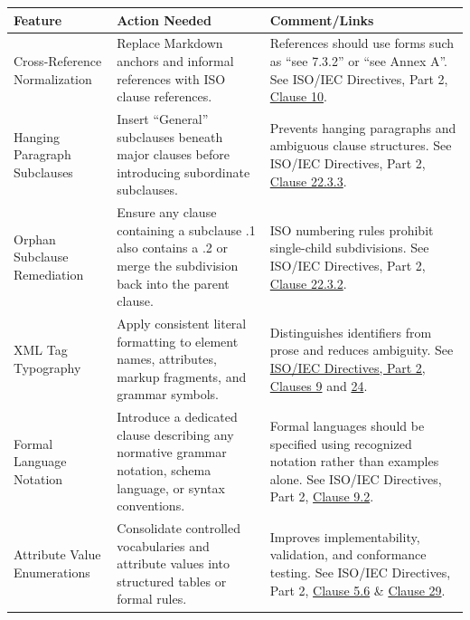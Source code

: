\documentclass[11pt,a4paper]{article}
\begin{document}
\begin{table}[h]
\begin{tabular}{|l|l|l|}
\hline
\textbf{Feature} & \textbf{Action Needed} & \textbf{Comment/Links} \\ \hline
Cross-Reference Normalization & Replace Markdown anchors and informal references with ISO clause references. & References should use forms such as “see 7.3.2” or “see Annex A”. See ISO/IEC Directives, Part 2, \href{https://www.iso.org/sites/directives/current/part2/index.xhtml\#\_idTextAnchor005}{Clause 10}. \\ \hline
Hanging Paragraph Subclauses & Insert “General” subclauses beneath major clauses before introducing subordinate subclauses. & Prevents hanging paragraphs and ambiguous clause structures. See ISO/IEC Directives, Part 2, \href{https://www.iso.org/sites/directives/current/part2/index.xhtml\#\_idTextAnchor005}{Clause 22.3.3}. \\ \hline
Orphan Subclause Remediation & Ensure any clause containing a subclause .1 also contains a .2 or merge the subdivision back into the parent clause. & ISO numbering rules prohibit single-child subdivisions. See ISO/IEC Directives, Part 2, \href{https://www.iso.org/sites/directives/current/part2/index.xhtml\#\_idTextAnchor005}{Clause 22.3.2}. \\ \hline
XML Tag Typography & Apply consistent literal formatting to element names, attributes, markup fragments, and grammar symbols. & Distinguishes identifiers from prose and reduces ambiguity. See \href{https://www.iso.org/sites/directives/current/part2/index.xhtml\#\_idTextAnchor005}{ISO/IEC Directives, Part 2, Clauses 9} and \href{https://www.iso.org/sites/directives/current/part2/index.xhtml\#\_idTextAnchor005}{24}. \\ \hline
Formal Language Notation & Introduce a dedicated clause describing any normative grammar notation, schema language, or syntax conventions. & Formal languages should be specified using recognized notation rather than examples alone. See ISO/IEC Directives, Part 2, \href{https://www.iso.org/sites/directives/current/part2/index.xhtml\#\_idTextAnchor005}{Clause 9.2}. \\ \hline
Attribute Value Enumerations & Consolidate controlled vocabularies and attribute values into structured tables or formal rules. & Improves implementability, validation, and conformance testing. See ISO/IEC Directives, Part 2, \href{https://www.iso.org/sites/directives/current/part2/index.xhtml\#\_idTextAnchor005}{Clause 5.6} \& \href{https://www.iso.org/sites/directives/current/part2/index.xhtml\#\_idTextAnchor005}{Clause 29}. \\ \hline

\end{tabular}
\end{table}
\end{document}
